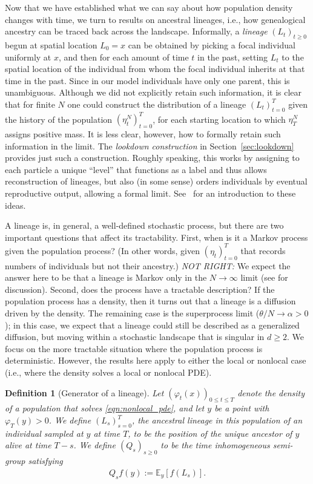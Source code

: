\documentclass[12pt]{article}
\newtheorem{definition}[theorem]{Definition}
\newcommand{\IE}{\mathbb E}
\newcommand{\comment}[1]{{\color{blue} \it #1}}
\begin{document}
Now that we have established what we can say about how population density changes with time,
we turn to results on ancestral lineages,
i.e., how genealogical ancestry can be traced back across the landscape.
Informally,
a \emph{lineage} $(L_t)_{t \ge 0}$
begun at spatial location $L_0 = x$
can be obtained by picking a focal individual uniformly at $x$,
and then for each amount of time $t$ in the past,
setting $L_t$ to the spatial location of the individual from whom
the focal individual inherits at that time in the past.
Since in our model individuals have only one parent, this is unambiguous.
Although we did not explicitly retain such information,
it is clear that for finite $N$
one could construct the distribution of a lineage $(L_t)_{t=0}^T$
given the history of the population $(\eta^N_t)_{t = 0}^T$,
for each starting location to which $\eta^N_T$ assigns positive mass.
It is less clear, however, how to formally retain such information in the limit.
The \emph{lookdown construction} in Section~\ref{sec:lookdown}
provides just such a construction.
Roughly speaking,
this works by assigning to each particle a unique ``level''
that functions as a label and thus allows reconstruction of lineages,
but also (in some sense) orders individuals by eventual reproductive output,
allowing a formal limit.
See~\citet{etheridge/kurtz:2018} for an introduction to these ideas.

A lineage is, in general, a well-defined stochastic process,
but there are two important questions
that affect its tractability.
First, when is it a Markov process given the population process?
(In other words, given $(\eta_t)_{t=0}^T$ that records numbers of individuals
but not their ancestry.)
\comment{NOT RIGHT:}
We expect the answer here to be that a lineage is Markov
only in the $N \to \infty$ limit
(see \citet{barton/depaulis/etheridge:2002} for discussion).
Second, does the process have a tractable description?
If the population process has a density,
then it turns out that a lineage is a diffusion driven by the density.
The remaining case is the superprocess limit ($\theta/N \to \alpha > 0$);
in this case, we expect that a lineage could still be described as a generalized diffusion,
but moving within a stochastic landscape that is singular in $d \ge 2$.
We focus on the more tractable situation where the population process is deterministic.
However, the results here apply to either the local or nonlocal case
(i.e., where the density solves a local or nonlocal PDE).


\begin{definition}[Generator of a lineage] \label{def:lineage_generator}
    Let $(\varphi_t(x))_{0 \le t \le T}$
    denote the density of a population that solves \eqref{eqn:nonlocal_pde},
    and let $y$ be a point with $\varphi_T(y) > 0$.
    We define $(L_s)_{s=0}^T$,
    the ancestral lineage in this population of an individual sampled at $y$ at time $T$,
    to be the position of the unique ancestor of $y$ alive at time $T - s$.
    We define
    $(Q_s)_{s \geq 0}$
    to be the time inhomogeneous semi-group satisfying
    \begin{align*}
        Q_s f(y) := \IE_y[ f(L_s) ] .
    \end{align*}
\end{definition}
\end{document}
